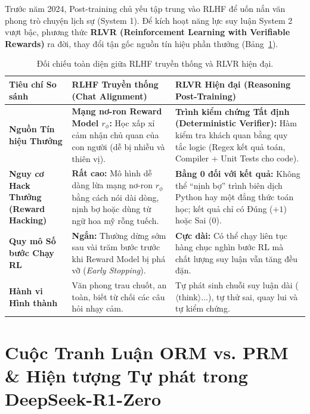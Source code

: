 Trước năm 2024, Post-training chủ yếu tập trung vào RLHF để uốn nắn văn phong trò chuyện lịch sự (System 1). Để kích hoạt năng lực suy luận System 2 vượt bậc, phương thức \textbf{RLVR (Reinforcement Learning with Verifiable Rewards)} \citep{lambert2024tulu, deepseek2025r1} ra đời, thay đổi tận gốc nguồn tín hiệu phần thưởng (Bảng~\ref{tab:rlhf_vs_rlvr}).

\begin{table}[h!]
\centering
\small
\renewcommand{\arraystretch}{1.35}
\begin{tabularx}{\textwidth}{>{\bfseries}p{3.2cm} p{5.5cm} X}
\toprule
Tiêu chí So sánh & RLHF Truyền thống (Chat Alignment) & RLVR Hiện đại (Reasoning Post-Training) \\
\midrule
Nguồn Tín hiệu Thưởng & \textbf{Mạng nơ-ron Reward Model $r_\phi$:} Học xấp xỉ cảm nhận chủ quan của con người (dễ bị nhiễu và thiên vị). & \textbf{Trình kiểm chứng Tất định (Deterministic Verifier):} Hàm kiểm tra khách quan bằng quy tắc logic (Regex kết quả toán, Compiler + Unit Tests cho code). \\
Nguy cơ Hack Thưởng (Reward Hacking) & \textbf{Rất cao:} Mô hình dễ dàng lừa mạng nơ-ron $r_\phi$ bằng cách nói dài dòng, nịnh bợ hoặc dùng từ ngữ hoa mỹ rỗng tuếch. & \textbf{Bằng 0 đối với kết quả:} Không thể ``nịnh bợ'' trình biên dịch Python hay một đẳng thức toán học; kết quả chỉ có Đúng ($+1$) hoặc Sai ($0$). \\
Quy mô Số bước Chạy RL & \textbf{Ngắn:} Thường dừng sớm sau vài trăm bước trước khi Reward Model bị phá vỡ (\textit{Early Stopping}). & \textbf{Cực dài:} Có thể chạy liên tục hàng chục nghìn bước RL mà chất lượng suy luận vẫn tăng đều đặn. \\
Hành vi Hình thành & Văn phong trau chuốt, an toàn, biết từ chối các câu hỏi nhạy cảm. & Tự phát sinh chuỗi suy luận dài ($\langle\text{think}\rangle\dots$), tự thử sai, quay lui và tự kiểm chứng. \\
\bottomrule
\end{tabularx}
\caption{Đối chiếu toàn diện giữa RLHF truyền thống và RLVR hiện đại.}
\label{tab:rlhf_vs_rlvr}
\end{table}

\section{Cuộc Tranh Luận ORM vs. PRM \& Hiện tượng Tự phát trong DeepSeek-R1-Zero}
\label{sec:orm_vs_prm_deepseek}

